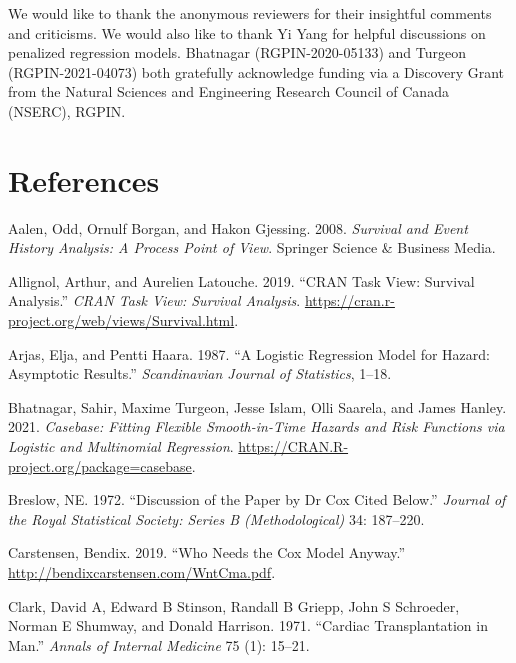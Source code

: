 We would like to thank the anonymous reviewers for their insightful comments and criticisms. We would also like to thank Yi Yang for helpful discussions on penalized regression models. Bhatnagar (RGPIN-2020-05133) and Turgeon (RGPIN-2021-04073) both gratefully acknowledge funding via a Discovery Grant from the Natural Sciences and Engineering Research Council of Canada (NSERC), RGPIN.

\hypertarget{references}{%
\section*{References}\label{references}}

\hypertarget{refs}{}
\begin{CSLReferences}{1}{0}
\leavevmode{}%
Aalen, Odd, Ornulf Borgan, and Hakon Gjessing. 2008. \emph{Survival and Event History Analysis: A Process Point of View}. Springer Science \& Business Media.

\leavevmode{}%
Allignol, Arthur, and Aurelien Latouche. 2019. {``CRAN Task View: Survival Analysis.''} \emph{CRAN Task View: Survival Analysis}. \url{https://cran.r-project.org/web/views/Survival.html}.

\leavevmode{}%
Arjas, Elja, and Pentti Haara. 1987. {``A Logistic Regression Model for Hazard: Asymptotic Results.''} \emph{Scandinavian Journal of Statistics}, 1--18.

\leavevmode{}%
Bhatnagar, Sahir, Maxime Turgeon, Jesse Islam, Olli Saarela, and James Hanley. 2021. \emph{Casebase: Fitting Flexible Smooth-in-Time Hazards and Risk Functions via Logistic and Multinomial Regression}. \url{https://CRAN.R-project.org/package=casebase}.

\leavevmode{}%
Breslow, NE. 1972. {``Discussion of the Paper by {Dr Cox} Cited Below.''} \emph{Journal of the Royal Statistical Society: Series B (Methodological)} 34: 187--220.

\leavevmode{}%
Carstensen, Bendix. 2019. {``Who Needs the Cox Model Anyway.''} \url{http://bendixcarstensen.com/WntCma.pdf}.

\leavevmode{}%
Clark, David A, Edward B Stinson, Randall B Griepp, John S Schroeder, Norman E Shumway, and Donald Harrison. 1971. {``Cardiac Transplantation in Man.''} \emph{Annals of Internal Medicine} 75 (1): 15--21.


\end{CSLReferences}
